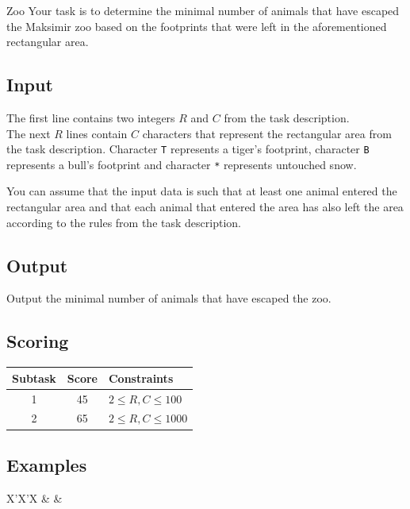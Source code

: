 \begin{statement}[
  problempoints=110,
  timelimit=2 seconds,
  memorylimit=512 MiB,
]{Zoo}
Your task is to determine the minimal number of animals that have
escaped the Maksimir zoo based on the footprints that were left in the
aforementioned rectangular area.

\subsection*{Input}
The first line contains two integers $R$ and $C$ from the task description. \\
The next $R$ lines contain $C$ characters that represent the rectangular area
from the task description. Character \texttt{T} represents a tiger's footprint,
character \texttt{B} represents a bull's footprint and character \texttt{*}
represents untouched snow.

You can assume that the input data is such that at least one animal entered the
rectangular area and that each animal that entered the area has also left the
area according to the rules from the task description.

\subsection*{Output}
Output the minimal number of animals that have escaped the zoo.

\subsection*{Scoring}
{\renewcommand{\arraystretch}{1.4}
  \setlength{\tabcolsep}{6pt}
  \begin{tabular}{ccl}
 Subtask & Score & Constraints \\ \midrule
  1 & 45 & $2 \le R, C \le 100$ \\
  2 & 65 & $2 \le R, C \le 1000$ \\
\end{tabular}}

\subsection*{Examples}
\begin{tabularx}{\textwidth}{X'X'X}
 &
 &
\end{tabularx}


\end{statement}
